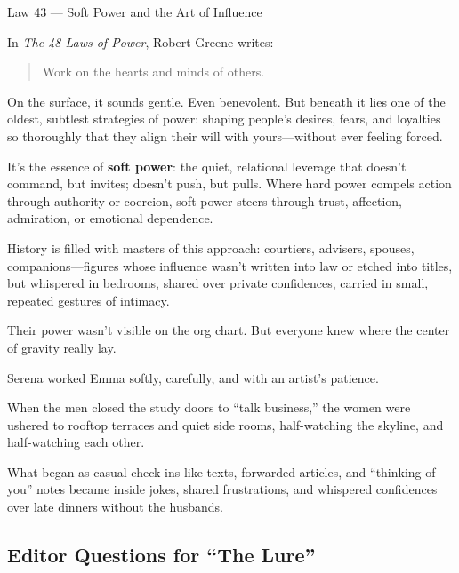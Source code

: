 \begin{PhilosophicalSidebar}{Law 43 --- Soft Power and the Art of Influence}

  In \textit{The 48 Laws of Power}, Robert Greene writes:
  
  \begin{quote}
    Work on the hearts and minds of others.
  \end{quote}
  
  On the surface, it sounds gentle. Even benevolent. But beneath it lies one of the oldest, subtlest strategies of 
  power: shaping people’s desires, fears, and loyalties so thoroughly that they align their will with yours—without 
  ever feeling forced.

  \medskip

  It’s the essence of \textbf{soft power}: the quiet, relational leverage that doesn’t command, but invites; doesn’t 
  push, but pulls. Where hard power compels action through authority or coercion, soft power steers through trust, 
  affection, admiration, or emotional dependence.
  
  \medskip
  
  History is filled with masters of this approach: courtiers, advisers, spouses, companions—figures whose influence 
  wasn’t written into law or etched into titles, but whispered in bedrooms, shared over private confidences, carried 
  in small, repeated gestures of intimacy.

  \medskip
  
  Their power wasn’t visible on the org chart.  But everyone knew where the center of gravity really lay.
  
\end{PhilosophicalSidebar}

\medskip

Serena worked Emma softly, carefully, and with an artist’s patience.  

When the men closed the study doors to ``talk business,'' the women were ushered to rooftop terraces and quiet side rooms, 
half-watching the skyline, and half-watching each other.  

What began as casual check-ins like texts, forwarded articles, and ``thinking of you'' notes became inside jokes, shared 
frustrations, and whispered confidences over late dinners without the husbands.  


\subsection{Editor Questions for ``The Lure''}

